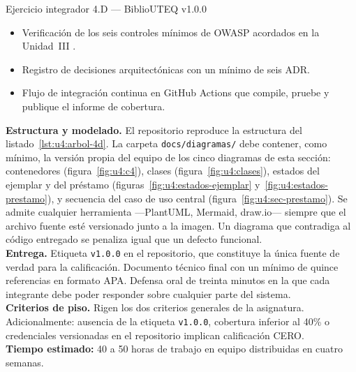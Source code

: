 \documentclass[11pt,a4paper,openany]{book}
\begin{document}
\begin{cajaejercicio}{Ejercicio integrador 4.D --- BiblioUTEQ v1.0.0}
\begin{itemize}
		\item Verificación de los seis controles mínimos de OWASP acordados en la Unidad~III \cite{owasp2021top10}.
		\item Registro de decisiones arquitectónicas con un mínimo de seis ADR.
		\item Flujo de integración continua en GitHub Actions que compile, pruebe y publique el informe de cobertura.
	\end{itemize}
	\textbf{Estructura y modelado.} El repositorio reproduce la estructura del listado~\ref{lst:u4:arbol-4d}. La carpeta \texttt{docs/diagramas/} debe contener, como mínimo, la versión propia del equipo de los cinco diagramas de esta sección: contenedores (figura~\ref{fig:u4:c4}), clases (figura~\ref{fig:u4:clases}), estados del ejemplar y del préstamo (figuras~\ref{fig:u4:estados-ejemplar} y~\ref{fig:u4:estados-prestamo}), y secuencia del caso de uso central (figura~\ref{fig:u4:sec-prestamo}). Se admite cualquier herramienta ---PlantUML, Mermaid, draw.io--- siempre que el archivo fuente esté versionado junto a la imagen. Un diagrama que contradiga al código entregado se penaliza igual que un defecto funcional.\\[4pt]
	\textbf{Entrega.} Etiqueta \texttt{v1.0.0} en el repositorio, que constituye la única fuente de verdad para la calificación. Documento técnico final con un mínimo de quince referencias en formato APA. Defensa oral de treinta minutos en la que cada integrante debe poder responder sobre cualquier parte del sistema.\\[4pt]
	\textbf{Criterios de piso.} Rigen los dos criterios generales de la asignatura. Adicionalmente: ausencia de la etiqueta \texttt{v1.0.0}, cobertura inferior al 40\% o credenciales versionadas en el repositorio implican calificación CERO.\\[4pt]
	\textbf{Tiempo estimado:} 40 a 50 horas de trabajo en equipo distribuidas en cuatro semanas.
\end{cajaejercicio}
\end{document}
